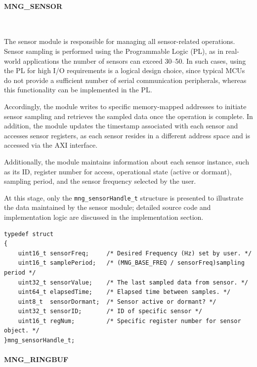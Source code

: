 \paragraph{MNG\_SENSOR}\

The sensor module is responsible for managing all sensor-related operations. Sensor 
sampling is performed using the Programmable Logic (PL), as in real-world applications 
the number of sensors can exceed 30–50. In such cases, using the PL for high I/O 
requirements is a logical design choice, since typical MCUs do not provide a sufficient 
number of serial communication peripherals, whereas this functionality can be implemented 
in the PL.

Accordingly, the module writes to specific memory-mapped addresses to initiate sensor 
sampling and retrieves the sampled data once the operation is complete. In addition, 
the module updates the timestamp associated with each sensor and accesses sensor 
registers, as each sensor resides in a different address space and is accessed via the 
AXI interface.

Additionally, the module maintains information about each sensor instance, such as 
its ID, register number for access, operational state (active or dormant), sampling 
period, and the sensor frequency selected by the user.

At this stage, only the \texttt{mng\_sensorHandle\_t} structure is presented to illustrate 
the data maintained by the sensor module; detailed source code and implementation 
logic are discussed in the implementation section.


\begin{lstlisting}[caption={MNG Sensor handle structure}, label={lst:sensorhandle}]
typedef struct
{
    uint16_t sensorFreq;     /* Desired Frequency (Hz) set by user. */
    uint16_t samplePeriod;   /* (MNG_BASE_FREQ / sensorFreq)sampling period */
    uint32_t sensorValue;    /* The last sampled data from sensor. */
    uint64_t elapsedTime;    /* Elapsed time between samples. */
    uint8_t  sensorDormant;  /* Sensor active or dormant? */
    uint32_t sensorID;       /* ID of specific sensor */
    uint16_t regNum;         /* Specific register number for sensor object. */
}mng_sensorHandle_t;
\end{lstlisting}


\paragraph{MNG\_RINGBUF}\

